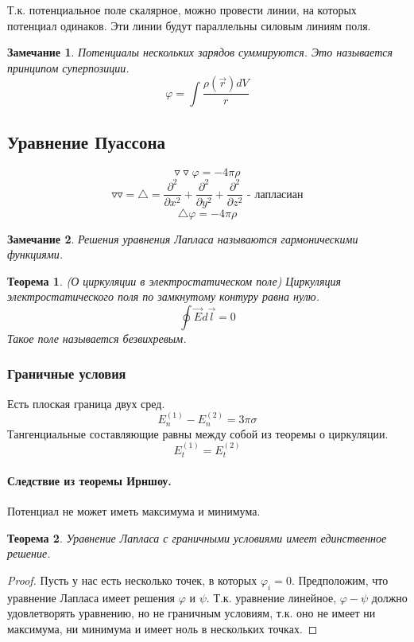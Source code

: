 \documentclass{article}
\newtheorem{teo}{Теорема}
\newtheorem*{ntc}{Замечание}
\begin{document}
    Т.к. потенциальное поле скалярное, можно провести линии, на которых потенциал одинаков. Эти линии будут параллельны силовым линиям поля.
    
    \begin{ntc}
    Потенциалы нескольких зарядов суммируются. Это называется принципом суперпозиции.
    $$ \varphi = \int \frac{\rho(\overrightarrow{r})dV}{r} $$
    \end{ntc}
    
    \subsection*{Уравнение Пуассона}
    $$ \triangledown \triangledown \varphi = -4\pi\rho $$
    $$ \triangledown \triangledown = \triangle = \frac{\partial^2}{\partial x^2} + \frac{\partial^2}{\partial y^2} + \frac{\partial^2}{\partial z^2} \text{ - лапласиан} $$
    $$ \boxed{\triangle \varphi = - 4\pi\rho} $$
    
    \begin{ntc}
    Решения уравнения Лапласа называются гармоническими функциями.
    \end{ntc}
    
    \begin{teo} {(О циркуляции в электростатическом поле)}
    Циркуляция электростатического поля по замкнутому контуру равна нулю.
    $$ \oint \overrightarrow{E}d\overrightarrow{l} = 0 $$
    Такое поле называется безвихревым.
    \end{teo}
    
    \subsubsection*{Граничные условия}
    Есть плоская граница двух сред. 
    $$ E_n^{(1)} - E_n^{(2)} = 3\pi\sigma $$
    Тангенциальные составляющие равны между собой из теоремы о циркуляции.
    $$ E_t^{(1)} = E_t^{(2)} $$
    
    \paragraph{Следствие из теоремы Ирншоу.} Потенциал не может иметь максимума и минимума.
    \begin{teo}
    Уравнение Лапласа с граничными условиями имеет единственное решение.
    \end{teo}  
    \begin{proof}
    Пусть у нас есть несколько точек, в которых $\varphi_i = 0$.
    Предположим, что уравнение Лапласа имеет решения $\varphi$ и $\psi$. Т.к. уравнение линейное, $\varphi - \psi$ должно удовлетворять уравнению, но не граничным условиям, т.к. оно не имеет ни максимума, ни минимума и имеет ноль в нескольких точках.
    \end{proof}
    
\end{document}
